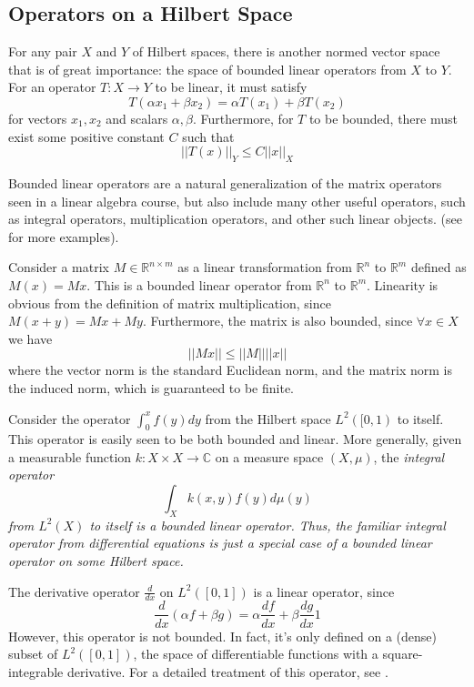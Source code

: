 \subsection{Operators on a Hilbert Space}
For any pair $X$ and $Y$ of Hilbert spaces, there is another normed vector space
that is of great importance: the space of bounded linear operators from $X$ to
$Y$. For an operator $T:X\to Y$ to be linear, it must satisfy
\[
    T(\alpha x_1 + \beta x_2) = \alpha T(x_1) + \beta T(x_2)
\]
for vectors $x_1, x_2$ and scalars $\alpha, \beta$. Furthermore, for $T$ to be
bounded, there must exist some positive constant $C$ such that
\[
    ||T(x)||_Y \leq C||x||_X
\]

Bounded linear operators are a natural generalization of the matrix operators
seen in a linear algebra course, but also include many other useful operators,
such as integral operators, multiplication operators, and other such linear
objects. (see \cite[p. 32-34]{MacCluer2009} for more examples).

\begin{example}
    Consider a matrix $M\in \mathbb{R}^{n\times m}$ as a linear transformation
    from $\mathbb{R}^n$ to $\mathbb{R}^m$ defined as $M(x) = Mx$. This is a
    bounded linear operator from $\mathbb{R}^n$ to $\mathbb{R}^m$. Linearity is
    obvious from the definition of matrix multiplication, since $M(x+y) = Mx +
    My$. Furthermore, the matrix is also bounded, since $\forall x \in X$ we
    have
    \[
        ||Mx|| \leq ||M||||x||
    \]
    where the vector norm is the standard Euclidean norm, and the matrix norm is
    the induced norm, which is guaranteed to be finite. %
\end{example}

\begin{example}
    Consider the operator $\int_0^x f(y)dy$ from the Hilbert space $L^2([0,1)$ 
    to itself. This operator is
    easily seen to be both bounded and linear. 
    More generally, given a measurable function $k:X\times X \to \mathbb{C}$ on
    a measure space $(X,\mu)$, the \em integral operator\em
    \[
        \int_X k(x,y)f(y)d\mu(y)
    \]
    from $L^2(X)$ to itself is a bounded linear operator. Thus, the familiar
    integral operator from differential equations is just a special case of a
    bounded linear operator on some Hilbert space.
\end{example}


\begin{example}
    The derivative operator $\frac{d}{dx}$ on $L^2([0,1])$ is a linear operator,
    since
    \[
        \frac{d}{dx}(\alpha f + \beta g) =
        \alpha\frac{df}{dx} + \beta\frac{dg}{dx}1
    \]
    However, this operator is not bounded. In fact, it's only defined on a
    (dense) subset of $L^2([0,1])$, the space of differentiable functions with a
    square-integrable derivative. For a detailed treatment of this operator, see
    \cite[p. 127-128, Ch. 9]{Hall2013}.
\end{example}

